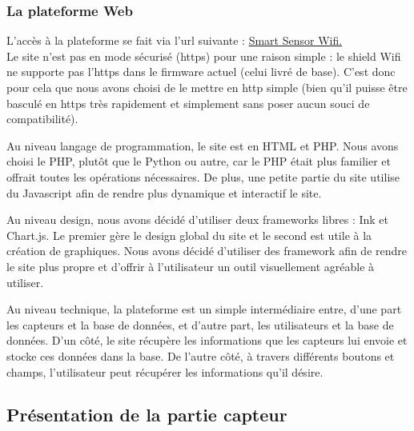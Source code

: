 		\subsubsection{La plateforme Web}
		\par
		L'accès à la plateforme se fait via l'url suivante : \href{http://smartsensorwifi.plil.net}{Smart Sensor Wifi.}
		\\%
		Le site n'est pas en mode sécurisé (https) pour une raison simple : le shield Wifi ne supporte pas l'https dans le firmware actuel (celui livré de base). C'est donc pour cela que nous avons choisi de le mettre en http simple (bien qu'il puisse être basculé en https très rapidement et simplement sans poser aucun souci de compatibilité).
		\par
		Au niveau langage de programmation, le site est en HTML et PHP. Nous avons choisi le PHP, plutôt que le Python ou autre, car le PHP était plus familier et offrait toutes les opérations nécessaires. De plus, une petite partie du site utilise du Javascript afin de rendre plus dynamique et interactif le site.
		\par
		Au niveau design, nous avons décidé d'utiliser deux frameworks libres : Ink et Chart.js. Le premier gère le design global du site et le second est utile à la création de graphiques. Nous avons décidé d'utiliser des framework afin de rendre le site plus propre et d'offrir à l'utilisateur un outil visuellement agréable à utiliser.
		\par
		Au niveau technique, la plateforme est un simple intermédiaire entre, d'une part les capteurs et la base de données, et d'autre part, les utilisateurs et la base de données. D'un côté, le site récupère les informations que les capteurs lui envoie et stocke ces données dans la base. De l'autre côté,  à travers différents boutons et champs, l'utilisateur peut récupérer les informations qu'il désire.
		
	\subsection{Présentation de la partie capteur}

